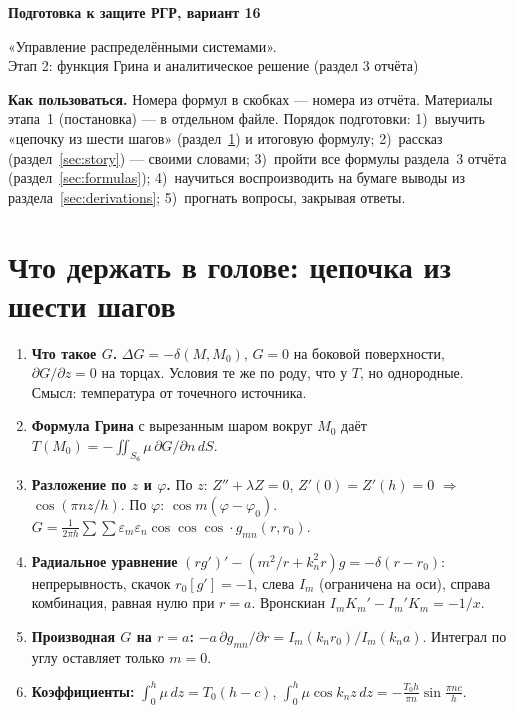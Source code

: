 \documentclass[a4paper,12pt]{article}
\begin{document}
\begin{center}
  {\Large\bfseries Подготовка к защите РГР, вариант 16\par}
  \vspace{4pt}
  {\large «Управление распределёнными системами».\\
   Этап 2: функция Грина и аналитическое решение (раздел 3 отчёта)\par}
\end{center}

\textbf{Как пользоваться.} Номера формул в скобках — номера из отчёта.
Материалы этапа~1 (постановка) — в отдельном файле. Порядок подготовки:
1)~выучить «цепочку из шести шагов» (раздел~\ref{sec:chain}) и итоговую
формулу; 2)~рассказ (раздел~\ref{sec:story}) — своими словами;
3)~пройти все формулы раздела~3 отчёта (раздел~\ref{sec:formulas});
4)~научиться воспроизводить на бумаге выводы из
раздела~\ref{sec:derivations}; 5)~прогнать вопросы, закрывая ответы.

\tableofcontents

\section{Что держать в голове: цепочка из шести шагов}
\label{sec:chain}

\begin{enumerate}
  \item \textbf{Что такое $G$.} $\Delta G=-\delta(M,M_0)$, $G=0$ на боковой
  поверхности, $\partial G/\partial z=0$ на торцах. Условия те же по роду,
  что у $T$, но однородные. Смысл: температура от точечного источника.
  \item \textbf{Формула Грина} с вырезанным шаром вокруг $M_0$ даёт
  $T(M_0)=-\iint_{S_{\text{б}}}\mu\,\partial G/\partial n\,dS$.
  \item \textbf{Разложение по $z$ и $\varphi$.} По $z$: $Z''+\lambda Z=0$,
  $Z'(0)=Z'(h)=0$ $\Rightarrow$ $\cos(\pi nz/h)$. По $\varphi$:
  $\cos m(\varphi-\varphi_0)$. $G=\frac{1}{2\pi h}\sum\sum
  \varepsilon_m\varepsilon_n\cos\cos\cos\cdot g_{mn}(r,r_0)$.
  \item \textbf{Радиальное уравнение}
  $(rg')'-(m^2/r+k_n^2r)g=-\delta(r-r_0)$: непрерывность, скачок
  $r_0[g']=-1$, слева $I_m$ (ограничена на оси), справа комбинация,
  равная нулю при $r=a$. Вронскиан $I_mK_m'-I_m'K_m=-1/x$.
  \item \textbf{Производная $G$ на $r=a$:}
  $-a\,\partial g_{mn}/\partial r=I_m(k_nr_0)/I_m(k_na)$. Интеграл по углу
  оставляет только $m=0$.
  \item \textbf{Коэффициенты:} $\int_0^h\mu\,dz=T_0(h-c)$,
  $\int_0^h\mu\cos k_nz\,dz=-\frac{T_0h}{\pi n}\sin\frac{\pi nc}{h}$.
\end{enumerate}
\end{document}
